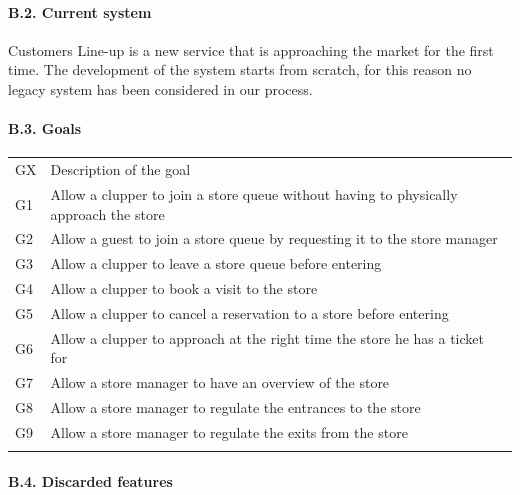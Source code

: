 \hypertarget{b.2.-current-system}{%
\paragraph{B.2. Current system}\label{b.2.-current-system}}

Customers Line-up is a new service that is approaching the market for
the first time. The development of the system starts from scratch, for
this reason no legacy system has been considered in our process.

\hypertarget{b.3.-goals}{%
\paragraph{B.3. Goals}\label{b.3.-goals}}

\begin{longtable}[]{@{}
  >{\raggedright\arraybackslash}p{}
  >{\raggedright\arraybackslash}p{}@{}}
\toprule
GX & Description of the goal \\ \addlinespace
\midrule
\endhead
G1 & Allow a clupper to join a store queue without having to physically
approach the store \\ \addlinespace
G2 & Allow a guest to join a store queue by requesting it to the store
manager \\ \addlinespace
G3 & Allow a clupper to leave a store queue before
entering \\ \addlinespace
G4 & Allow a clupper to book a visit to the store \\ \addlinespace
G5 & Allow a clupper to cancel a reservation to a store before
entering \\ \addlinespace
G6 & Allow a clupper to approach at the right time the store he has a
ticket for \\ \addlinespace
G7 & Allow a store manager to have an overview of the
store \\ \addlinespace
G8 & Allow a store manager to regulate the entrances to the
store \\ \addlinespace
G9 & Allow a store manager to regulate the exits from the
store \\ \addlinespace
\bottomrule
\end{longtable}

\hypertarget{b.4.-discarded-features}{%
\paragraph{B.4. Discarded features}\label{b.4.-discarded-features}}


